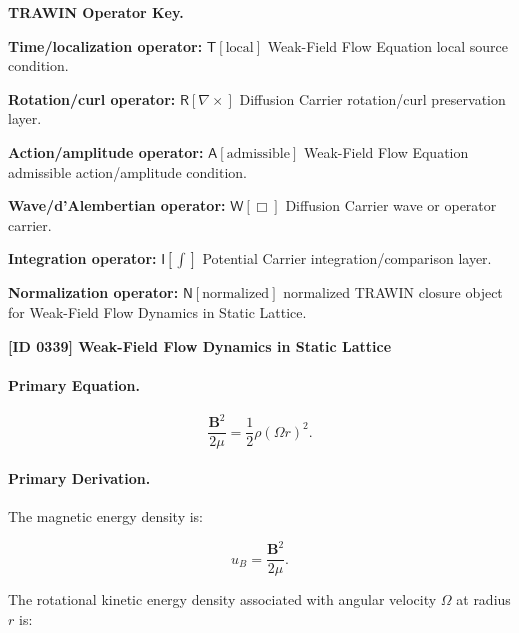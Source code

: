 \par\vspace{0.45\baselineskip}
\noindent\begin{minipage}[t]{\linewidth}
\begingroup
\small
\raggedright
\textbf{TRAWIN Operator Key.}\par
\noindent\textbf{Time/localization operator:} $\mathsf{T}\!\left[\mathrm{local}\right]$ Weak-Field Flow Equation local source condition.\par
\noindent\textbf{Rotation/curl operator:} $\mathsf{R}\!\left[\nabla\times\right]$ Diffusion Carrier rotation/curl preservation layer.\par
\noindent\textbf{Action/amplitude operator:} $\mathsf{A}\!\left[\mathrm{admissible}\right]$ Weak-Field Flow Equation admissible action/amplitude condition.\par
\noindent\textbf{Wave/d'Alembertian operator:} $\mathsf{W}\!\left[\Box\right]$ Diffusion Carrier wave or operator carrier.\par
\noindent\textbf{Integration operator:} $\mathsf{I}\!\left[\int\right]$ Potential Carrier integration/comparison layer.\par
\noindent\textbf{Normalization operator:} $\mathsf{N}\!\left[\mathrm{normalized}\right]$ normalized TRAWIN closure object for Weak-Field Flow Dynamics in Static Lattice.\par
\endgroup
\end{minipage}

\clearpage
\noindent\textbf{[ID 0339] Weak-Field Flow Dynamics in Static Lattice}\par
\vspace{0.35em}
\paragraph{Primary Equation.}
\begin{equation}
\frac{\mathbf{B}^2}{2\mu}
=
\frac{1}{2}\rho(\Omega r)^2 .
\end{equation}

\paragraph{Primary Derivation.}
The magnetic energy density is:

\begin{equation}
u_B
=
\frac{\mathbf{B}^2}{2\mu}.
\end{equation}

The rotational kinetic energy density associated with angular velocity $\Omega$ at radius $r$ is:

